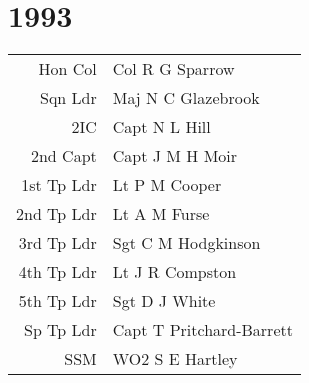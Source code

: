\chapter*{1993}

\begin{center}
  \begin{tabular}{rl}
    Hon Col & Col R G Sparrow \\
    Sqn Ldr & Maj N C Glazebrook \\
    2IC & Capt N L Hill \\
    2nd Capt & Capt J M H Moir \\
    1st Tp Ldr & Lt P M Cooper \\
    2nd Tp Ldr & Lt A M Furse \\
    3rd Tp Ldr & Sgt C M Hodgkinson \\
    4th Tp Ldr & Lt J R Compston \\
    5th Tp Ldr & Sgt D J White \\
    Sp Tp Ldr & Capt T Pritchard-Barrett \\
    SSM & WO2 S E Hartley \\
  \end{tabular}
\end{center}


